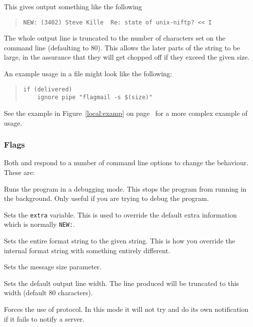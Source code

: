 This gives output something like the following
\begin{quote}\small\begin{verbatim}
NEW: (3402) Steve Kille  Re: state of unix-niftp? << I
\end{verbatim}\end{quote}

The whole output line is truncated to the number of characters set on
the command line (defaulting to 80). This allows the later parts of
the string to be large, in the assurance that they will get chopped off if
they exceed the given size.

An example usage in a  file might
look like the following:
\begin{quote}\small\begin{verbatim}
if (delivered)
    ignore pipe "flagmail -s $(size)"
\end{verbatim}\end{quote}
See the example in Figure~\ref{local:examp} on
page~\pageref{local:examp} for a more complex example of usage.

\subsubsection{Flags}

Both  and  respond to a number of command
line options to change the behaviour. These are:
\begin{describe}
\item[\verb|-d|:]	Runs the program in a debugging mode. This
stops the program from running in the background. Only useful if you are
trying to debug the program.

\item[\verb|-e string|:] Sets the \verb|extra| variable. This is used
to override the default extra information which is normally \verb|NEW:|.

\item[\verb|-f format|:] Sets the entire format string to the given
string. This is how you override the internal format string with
something entirely different.

\item[\verb|-s size|:] Sets the message size parameter.

\item[\verb|-w width|:]	Sets the default output line width. The line
produced will be truncated to this width (default 80 characters).

\item[\verb|-x|:] Forces the use of protocol. In this mode it will not
try and do its own notification if it fails to notify a server.
\end{describe}

